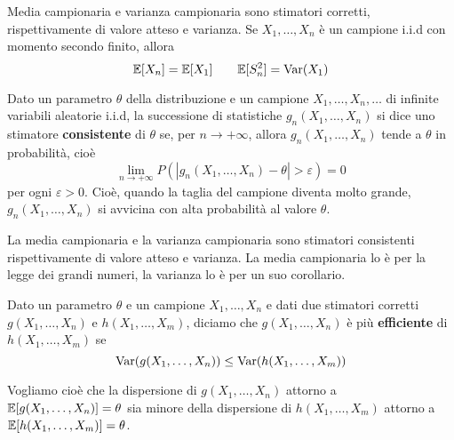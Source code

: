\begin{proposition}
	Media campionaria e varianza campionaria sono stimatori corretti, rispettivamente di valore
	atteso e varianza. Se $X_1, \dots, X_n$ è un campione i.i.d con momento secondo finito, allora
	\[ \mathbb{E}[X_n] = \mathbb{E}[X_1] \quad \quad \mathbb{E}[S_n^2] = \operatorname{Var}(X_1) \]
\end{proposition}

\begin{definition}\label{def: stimatore consistente}
	Dato un parametro $\theta$ della distribuzione e un campione $X_1, \dots, X_n, \dots$ di
	infinite variabili aleatorie i.i.d, la successione di statistiche $g_n(X_1, \dots, X_n)$ si
	dice uno stimatore \textbf{consistente} di $\theta$ se, per $n \to +\infty$, allora
	$g_n(X_1, \dots, X_n)$ tende a $\theta$ in probabilità, cioè
	\[ \lim_{n \to +\infty} P(|g_n(X_1, \dots, X_n) - \theta| > \varepsilon) = 0 \]
	per ogni $\varepsilon > 0$. Cioè, quando la taglia del campione diventa molto grande,
	$g_n(X_1, \dots, X_n)$ si avvicina con alta probabilità al valore $\theta$.
\end{definition}

La media campionaria e la varianza campionaria sono stimatori consistenti rispettivamente di valore
atteso e varianza. La media campionaria lo è per la legge dei grandi numeri, la varianza lo è per
un suo corollario.

\begin{definition}\label{def: stimatore efficiente}
	Dato un parametro $\theta$ e un campione $X_1, \dots, X_n$ e dati due stimatori corretti
	$g(X_1, \dots, X_n)$ e $h(X_1, \dots, X_m)$, diciamo che $g(X_1, \dots, X_n)$ è più
	\textbf{efficiente} di $h(X_1, \dots, X_m)$ se
	\[ \operatorname{Var}(g(X_1, \dots, X_n)) \leq \operatorname{Var}(h(X_1, \dots, X_m)) \]
\end{definition}

Vogliamo cioè che la dispersione di $g(X_1, \dots, X_n)$ attorno a
$\mathbb{E}[g(X_1, \dots, X_n)] = \theta$ sia minore della dispersione di $h(X_1, \dots, X_m)$ attorno a
$\mathbb{E}[h(X_1, \dots, X_m)] = \theta$.